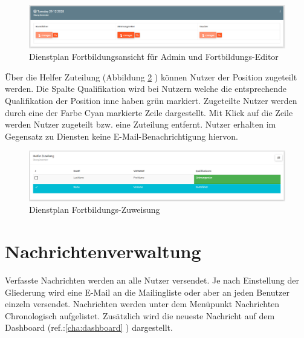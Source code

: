 \begin{figure}[h]
	\begin{addmargin}{-0.2\linewidth}
		\centering 
		\includegraphics[width=20cm]{Bilder/view_training_admin.png}
	\end{addmargin} 
	\caption[Fortbildungen Admin Ansicht]{Dienstplan Fortbildungsansicht für Admin und Fortbildungs-Editor}
	\label{fig:view_training_admin}
\end{figure}
Über die Helfer Zuteilung (Abbildung \ref{fig:view_training_assign} \textit{}) können Nutzer der Position zugeteilt werden. Die Spalte Qualifikation wird bei Nutzern welche die entsprechende Qualifikation der Position inne haben grün markiert. Zugeteilte Nutzer werden durch eine der Farbe Cyan markierte Zeile dargestellt. Mit Klick auf die Zeile werden Nutzer zugeteilt bzw. eine Zuteilung entfernt. Nutzer erhalten im Gegensatz zu Diensten keine E-Mail-Benachrichtigung hiervon.

\begin{figure}[h]
	\begin{addmargin}{-0.2\linewidth}
		\centering 
		\includegraphics[width=20cm]{Bilder/view_training_assign.png}
	\end{addmargin} 
	\caption[Fortbildungs-Zuweisung]{Dienstplan Fortbildungs-Zuweisung}
	\label{fig:view_training_assign}
\end{figure}
		
\section{Nachrichtenverwaltung}
\label{sec:admin_news}
Verfasste Nachrichten werden an alle Nutzer versendet. Je nach Einstellung der Gliederung wird eine E-Mail an die Mailingliste oder aber an jeden Benutzer einzeln versendet.
Nachrichten werden unter dem Menüpunkt \glqq Nachrichten\grqq{} Chronologisch aufgelistet. Zusätzlich wird die neueste Nachricht auf dem Dashboard (ref.:\ref{cha:dashboard} ) dargestellt.